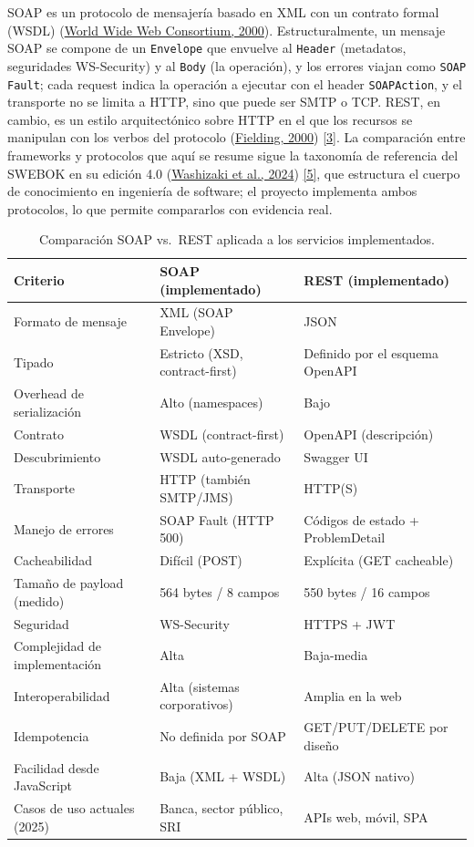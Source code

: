 \documentclass[12pt,a4paper]{article}
\begin{document}
SOAP es un protocolo de mensajería basado en XML con un contrato formal (WSDL)
(\hyperlink{ref:w3c}{World Wide Web Consortium, 2000}). Estructuralmente, un mensaje SOAP se compone de un
\texttt{Envelope} que envuelve al \texttt{Header} (metadatos, seguridades WS-Security) y
al \texttt{Body} (la operación), y los errores viajan como \texttt{SOAP Fault}; cada
request indica la operación a ejecutar con el header \texttt{SOAPAction}, y el transporte
no se limita a HTTP, sino que puede ser SMTP o TCP. REST, en cambio, es un estilo
arquitectónico sobre HTTP en el que los recursos se manipulan con los verbos del protocolo
(\hyperlink{ref:fielding2000}{Fielding, 2000}) \hyperlink{ieee3}{[3]}. La comparación entre frameworks y protocolos que aquí se resume sigue
la taxonomía de referencia del SWEBOK en su edición 4.0 (\hyperlink{ref:washizaki}{Washizaki et al., 2024}) \hyperlink{ieee5}{[5]}, que
estructura el cuerpo de conocimiento en ingeniería de software; el proyecto implementa
ambos protocolos, lo que permite compararlos con evidencia real.

\begin{table}[H]
\centering
\caption{Comparación SOAP vs.\ REST aplicada a los servicios implementados.}
\label{tab:soap-rest}
\footnotesize
\setlength{\tabcolsep}{4pt}
\renewcommand{\arraystretch}{1.3}
\begin{tabularx}{\textwidth}{lXX}
\toprule
Criterio & SOAP (implementado) & REST (implementado) \\
\midrule
Formato de mensaje & XML (SOAP Envelope) & JSON \\
Tipado & Estricto (XSD, contract-first) & Definido por el esquema OpenAPI \\
Overhead de serialización & Alto (namespaces) & Bajo \\
Contrato & WSDL (contract-first) & OpenAPI (descripción) \\
Descubrimiento & WSDL auto-generado & Swagger UI \\
Transporte & HTTP (también SMTP/JMS) & HTTP(S) \\
Manejo de errores & SOAP Fault (HTTP 500) & Códigos de estado + ProblemDetail \\
Cacheabilidad & Difícil (POST) & Explícita (GET cacheable) \\
Tamaño de payload (medido) & 564 bytes / 8 campos & 550 bytes / 16 campos \\
Seguridad & WS-Security & HTTPS + JWT \\
Complejidad de implementación & Alta & Baja-media \\
Interoperabilidad & Alta (sistemas corporativos) & Amplia en la web \\
Idempotencia & No definida por SOAP & GET/PUT/DELETE por diseño \\
Facilidad desde JavaScript & Baja (XML + WSDL) & Alta (JSON nativo) \\
Casos de uso actuales (2025) & Banca, sector público, SRI & APIs web, móvil, SPA \\
\bottomrule
\end{tabularx}
\end{table}
\end{document}
